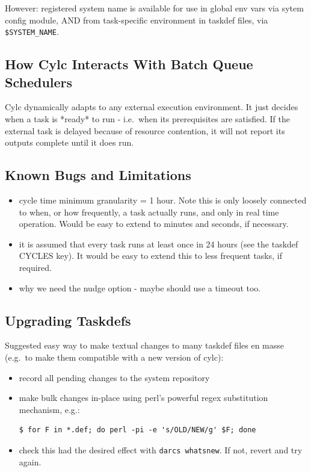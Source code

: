 \documentclass[11pt,a4paper]{article}
\begin{document}
    However: registered system name is available for use in global 
    env vars via sytem config module, AND from task-specific 
    environment in taskdef files, via \lstinline=$SYSTEM_NAME=.

\subsection{How Cylc Interacts With Batch Queue Schedulers}
\label{HowCylcInteractsWithBatchQueueSchedulers}

Cylc dynamically adapts to any external execution environment. It just
decides when a task is *ready* to run - i.e.\ when its prerequisites 
are satisfied.  If the external task is delayed because of resource
contention, it will not report its outputs complete until it does run.

\subsection{Known Bugs and Limitations}

\begin{itemize}
    \item cycle time minimum granularity = 1 hour. Note this is
        only loosely connected to when, or how frequently, a task
        actually runs, and only in real time operation. Would be easy to
        extend to minutes and seconds, if necessary.

    \item it is assumed that every task runs at least once in 24 hours
        (see the taskdef CYCLES key). It would be easy to extend this to
        less frequent tasks, if required.

    \item why we need the nudge option - maybe should use a timeout too.

\end{itemize}

\subsection{Upgrading Taskdefs}

Suggested easy way to make textual changes to many taskdef files en
masse (e.g.\ to make them compatible with a new version of cylc):

\begin{itemize}
    \item record all pending changes to the system repository
    \item make bulk changes in-place using perl's powerful regex 
       substitution mechanism, e.g.:
       \begin{lstlisting}
$ for F in *.def; do perl -pi -e 's/OLD/NEW/g' $F; done
       \end{lstlisting}
   \item check this had the desired effect with 
       \lstinline=darcs whatsnew=. If not, revert and try again.
\end{itemize}
\end{document}
